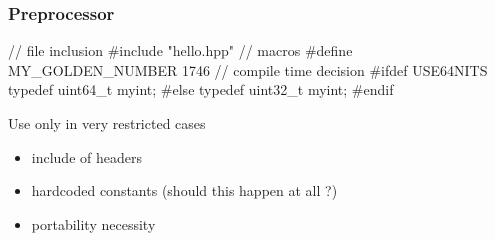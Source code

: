 \begin{frame}[fragile,label=current]
  \frametitle{Preprocessor}
  \begin{cppcode*}{}
    // file inclusion
    #include "hello.hpp"
    // macros
    #define MY_GOLDEN_NUMBER 1746
    // compile time decision
    #ifdef USE64NITS
      typedef uint64_t myint;
    #else
      typedef uint32_t myint;
    #endif
  \end{cppcode*}
  \pause
  \begin{block}{Use only in very restricted cases}
    \begin{itemize}
    \item include of headers
    \item hardcoded constants {\scriptsize (should this happen at all ?)}
    \item portability necessity
    \end{itemize}
  \end{block}
\end{frame}

